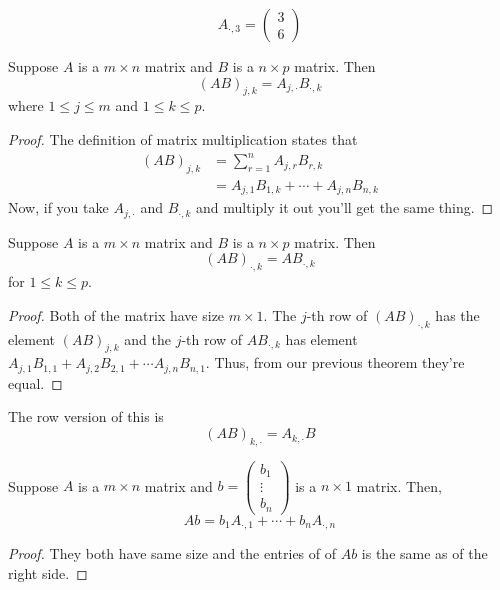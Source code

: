 \[
A_{\cdot, 3} = \begin{pmatrix}
     3 \\ 6  
\end{pmatrix}
 \]


\begin{theorem}
    Suppose $A$ is a $m \times n$ matrix and $B$ is a $n \times p$ matrix. Then
    \[ (AB)_{j,k} = A_{j, \cdot} B_{\cdot,k} \]
    where $1 \le j \le m$ and $1 \le k \le p$.
\end{theorem}

\begin{proof}
    The definition of matrix multiplication states that
    \begin{align*}
    (AB)_{j,k} &= \sum_{r=1}^{n} A_{j,r} B_{r,k} \\
    &= A_{j,1} B_{1,k} + \cdots + A_{j,n} B_{n,k}
    \end{align*} 
    Now, if you take $A_{j,\cdot}$ and $B_{\cdot,k}$ and multiply it out you'll get the same thing. 
\end{proof}

\begin{theorem}
    Suppose $A$ is a $m \times n$ matrix and $B$ is a $n \times p$ matrix. Then
    \[ (AB)_{\cdot, k} = A B_{\cdot, k} \]
    for $1 \le k \le p$.
\end{theorem}

\begin{proof}
    Both of the matrix have size $m \times 1$. The $j$-th row of $(AB)_{\cdot,k}$ has the element $(AB)_{j,k}$ 
    and the $j$-th row of $A B_{\cdot,k}$ has element $A_{j,1} B_{1,1} + A_{j,2} B_{2,1} + \cdots A_{j,n} B_{n,1}$.
    Thus, from our previous theorem they're equal.   
\end{proof}

\begin{remark}
    The row version of this is 
    \[ (AB)_{k, \cdot} = A_{k,\cdot} B \]
\end{remark}

\begin{theorem}
    Suppose $A$ is a $m \times n$ matrix and $b = \begin{pmatrix}
        b_1 \\ \vdots \\ b_n
    \end{pmatrix}$ is a $n \times 1$ matrix. Then, 
    \[ Ab = b_1 A_{\cdot,1} + \cdots + b_n A_{\cdot, n} \] 
\end{theorem}

\begin{proof}
    They both have same size and the entries of of $Ab$ is the same as of the right side.
\end{proof}

